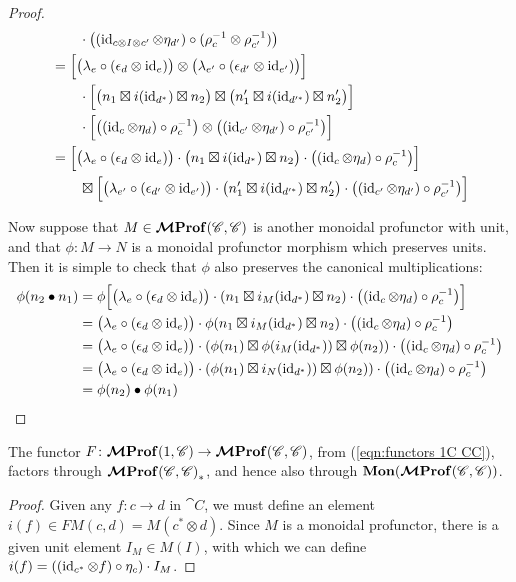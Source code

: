 \documentclass[12pt,oneside,article,draft]{memoir}
\begin{document}
\begin{proof}
\begin{align*}
		&\qquad \cdot\bigl((\operatorname{id}_{c\otimes I\otimes c'}\otimes\eta_{d'})\circ(\rho_c^{-1}\otimes\rho_{c'}^{-1})\bigr) \\
		&= \Bigl[\bigl(\lambda_e\circ(\epsilon_d\otimes\operatorname{id}_e)\bigr)\otimes\bigl(\lambda_{e'}\circ(\epsilon_{d'}\otimes\operatorname{id}_{e'})\bigr)\Bigr] \\
		&\qquad \cdot\Bigl[\bigl(n_1\boxtimes i(\operatorname{id}_{d^*})\boxtimes n_2\bigr)\boxtimes\bigl(n'_1\boxtimes i(\operatorname{id}_{d'^*})\boxtimes n'_2\bigr)\Bigr] \\
		&\qquad \cdot\Bigl[\bigl((\operatorname{id}_c\otimes\eta_d)\circ\rho_c^{-1}\bigr)\otimes\bigl((\operatorname{id}_{c'}\otimes\eta_{d'})\circ\rho_{c'}^{-1}\bigr)\Bigr] \\
		&= \Bigl[\bigl(\lambda_e\circ(\epsilon_d\otimes\operatorname{id}_e)\bigr)\cdot\bigl(n_1\boxtimes i(\operatorname{id}_{d^*})\boxtimes n_2\bigr)\cdot\bigl((\operatorname{id}_c\otimes\eta_d)\circ\rho_c^{-1}\bigr)\Bigr] \\
		&\qquad \boxtimes\Bigl[\bigl(\lambda_{e'}\circ(\epsilon_{d'}\otimes\operatorname{id}_{e'})\bigr)\cdot\bigl(n'_1\boxtimes i(\operatorname{id}_{d'^*})\boxtimes n'_2\bigr)\cdot\bigl((\operatorname{id}_{c'}\otimes\eta_{d'})\circ\rho_{c'}^{-1}\bigr)\Bigr]
	\end{align*}

	Now suppose that $M\in\bm{\mathcal{M}}\mathbf{Prof}(\mathscr{C},\mathscr{C})$ is another monoidal profunctor with unit, and that $\phi\colon M\to N$ is a monoidal profunctor morphism which preserves units.
	Then it is simple to check that $\phi$ also preserves the canonical multiplications:
	\begin{align*}
		\phi(n_2\bullet n_1) &= \phi\Bigl[\bigl(\lambda_e\circ(\epsilon_d\otimes\operatorname{id}_e)\bigr)\cdot(n_1\boxtimes i_M(\operatorname{id}_{d^*})\boxtimes n_2)\cdot\bigl((\operatorname{id}_c\otimes \eta_d)\circ\rho_c^{-1}\bigr)\Bigr] \\
		&= \bigl(\lambda_e\circ(\epsilon_d\otimes\operatorname{id}_e)\bigr)\cdot\phi(n_1\boxtimes i_M(\operatorname{id}_{d^*})\boxtimes n_2)\cdot\bigl((\operatorname{id}_c\otimes \eta_d)\circ\rho_c^{-1}\bigr) \\
		&= \bigl(\lambda_e\circ(\epsilon_d\otimes\operatorname{id}_e)\bigr)\cdot(\phi(n_1)\boxtimes \phi(i_M(\operatorname{id}_{d^*}))\boxtimes \phi(n_2))\cdot\bigl((\operatorname{id}_c\otimes \eta_d)\circ\rho_c^{-1}\bigr) \\
		&= \bigl(\lambda_e\circ(\epsilon_d\otimes\operatorname{id}_e)\bigr)\cdot(\phi(n_1)\boxtimes i_N(\operatorname{id}_{d^*}))\boxtimes \phi(n_2))\cdot\bigl((\operatorname{id}_c\otimes \eta_d)\circ\rho_c^{-1}\bigr) \\
		&= \phi(n_2)\bullet\phi(n_1)
	\end{align*}
\end{proof}

\begin{proposition}\label{Prop:canonical unit}
	The functor $F\colon\bm{\mathcal{M}}\mathbf{Prof}(1,\mathscr{C})\to\bm{\mathcal{M}}\mathbf{Prof}(\mathscr{C},\mathscr{C})$, from (\ref{eqn:functors 1C CC}), factors through $\bm{\mathcal{M}}\mathbf{Prof}{(\mathscr{C},\mathscr{C})}_*$, and hence also through $\mathbf{Mon}(\bm{\mathcal{M}}\mathbf{Prof}(\mathscr{C},\mathscr{C}))$.
\end{proposition}
\begin{proof}
	Given any $f\colon c\to d$ in $\cat{C}$, we must define an element $i(f)\in FM(c,d)=M(c^*\otimes d)$.
	Since $M$ is a monoidal profunctor, there is a given unit element $I_M\in M(I)$, with which we can define $i(f)=((\operatorname{id}_{c^*}\otimes f)\circ\eta_c)\cdot I_M$.
\end{proof}
\end{document}
